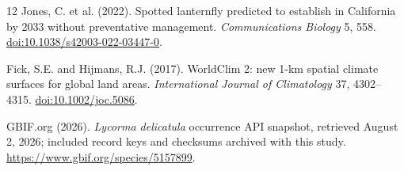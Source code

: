 \documentclass{article}
\begin{document}
{\begin{thebibliography}{12}
Jones, C. et al. (2022).
Spotted lanternfly predicted to establish in California by 2033 without preventative management.
\textit{Communications Biology} 5, 558.
\href{https://doi.org/10.1038/s42003-022-03447-0}{doi:10.1038/s42003-022-03447-0}.

Fick, S.E. and Hijmans, R.J. (2017).
WorldClim 2: new 1-km spatial climate surfaces for global land areas.
\textit{International Journal of Climatology} 37, 4302--4315.
\href{https://doi.org/10.1002/joc.5086}{doi:10.1002/joc.5086}.

GBIF.org (2026).
\textit{Lycorma delicatula} occurrence API snapshot, retrieved August 2, 2026; included record keys and checksums archived with this study.
\url{https://www.gbif.org/species/5157899}.

\end{thebibliography}
}
\end{document}
